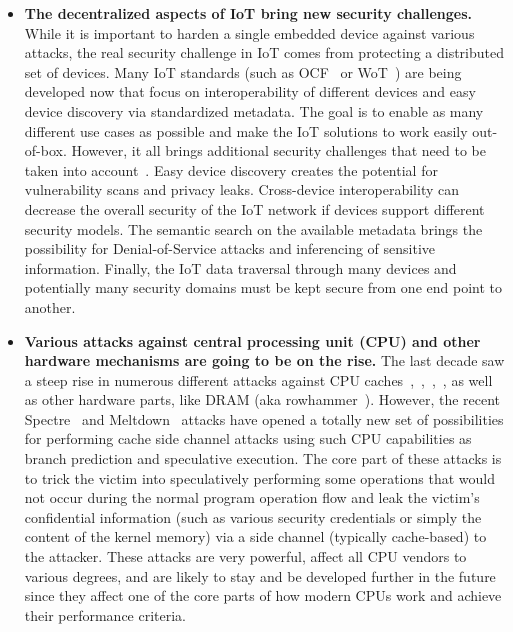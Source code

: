 \begin{itemize}
	\item \textbf{The decentralized aspects of IoT bring new security challenges.} While it is important to harden a single embedded device against various attacks, the real security challenge in IoT comes from protecting a distributed set of devices. Many IoT standards (such as OCF~\cite{ocf} or WoT~\cite{wot}) are being developed now that focus on interoperability of different devices and easy device discovery via standardized metadata. The goal is to enable as many different use cases as possible and make the IoT solutions to work easily out-of-box. However, it all brings additional security challenges that need to be taken into account~\cite{McCool2018}. Easy device discovery creates the potential for vulnerability scans and privacy leaks. Cross-device interoperability can decrease the overall security of the IoT network if devices support different security models. The semantic search on the available metadata brings the possibility for Denial-of-Service attacks and inferencing of sensitive information. Finally, the IoT data traversal through many devices and potentially many security domains must be kept secure from one end point to another.
	
	\item \textbf{Various attacks against central processing unit (CPU) and other hardware mechanisms are going to be on the rise.} The last decade saw a steep rise in numerous different attacks against CPU caches~\cite{lipp2016armageddon},~\cite{brasser2017software},~\cite{gras2017aslr},~\cite{irazoqui2017cache}, as well as other hardware parts, like DRAM (aka rowhammer~\cite{seaborn2015exploiting}). However, the recent Spectre~\cite{Kocher2018spectre} and Meltdown~\cite{Lipp2018meltdown} attacks have opened a totally new set of possibilities for performing cache side channel attacks using such CPU capabilities as branch prediction and speculative execution. The core part of these attacks is to trick the victim into speculatively performing some operations that would not occur during the normal program operation flow and leak the victim's confidential information (such as various security credentials or simply the content of the kernel memory) via a side channel (typically cache-based) to the attacker. These attacks are very powerful, affect all CPU vendors to various degrees, and are likely to stay and be developed further in the future since they affect one of the core parts of how modern CPUs work and achieve their performance criteria. 		
	

\end{itemize}
